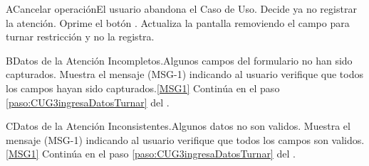 	\begin{UCtrayectoriaA}{A}{Cancelar operación}{El usuario abandona el Caso de Uso.}
			\UCpaso[\UCactor] Decide ya no registrar la atención.
			\UCpaso[\UCactor] Oprime el botón .
			\UCpaso Actualiza la pantalla removiendo el campo para turnar restricción y no la registra. 
	\end{UCtrayectoriaA}

	\begin{UCtrayectoriaA}{B}{Datos de la Atención Incompletos.}{Algunos campos del formulario no han sido capturados.}
			\UCpaso Muestra el mensaje (MSG-1) indicando al usuario verifique que todos los campos hayan sido capturados.\ref{MSG1}
			\UCpaso Continúa en el paso \ref{paso:CUG3ingresaDatosTurnar} del .
	\end{UCtrayectoriaA}

	\begin{UCtrayectoriaA}{C}{Datos de la Atención Inconsistentes.}{Algunos datos no son validos.}
			\UCpaso Muestra el mensaje (MSG-1) indicando al usuario verifique que todos los campos son validos.\ref{MSG1}
			\UCpaso Continúa en el paso \ref{paso:CUG3ingresaDatosTurnar} del .
	\end{UCtrayectoriaA}